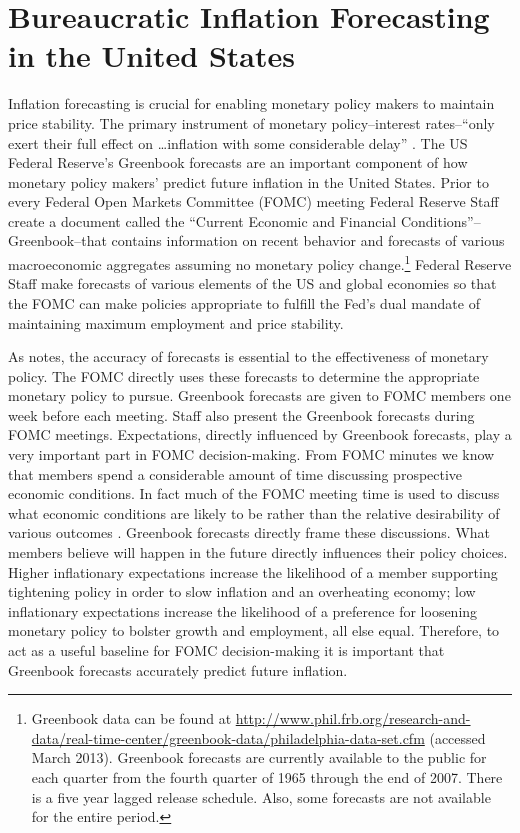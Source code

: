 \documentclass[a4paper]{article}
\begin{document}

\section{Bureaucratic Inflation Forecasting in the United States}

Inflation forecasting is crucial for enabling monetary policy makers to maintain price stability. The primary instrument of monetary policy--interest rates--``only exert their full effect on \ldots inflation with some considerable delay'' \cite[59]{Goodhart2001}. The US Federal Reserve's Greenbook forecasts are an important component of how monetary policy makers' predict future inflation in the United States. Prior to every Federal Open Markets Committee (FOMC) meeting Federal Reserve Staff create a document called the ``Current Economic and Financial Conditions''--Greenbook--that contains information on recent behavior and forecasts of various macroeconomic aggregates assuming no monetary policy change.\footnote{Greenbook data can be found at {\url{http://www.phil.frb.org/research-and-data/real-time-center/greenbook-data/philadelphia-data-set.cfm}} (accessed March 2013). Greenbook forecasts are currently available to the public for each quarter from the fourth quarter of 1965 through the end of 2007. There is a five year lagged release schedule. Also, some forecasts are not available for the entire period.} Federal Reserve Staff make forecasts of various elements of the US and global economies so that the FOMC can make policies appropriate to fulfill the Fed's dual mandate of maintaining maximum employment and price stability.

As \cite{Svensson2005} notes, the accuracy of forecasts is essential to the effectiveness of monetary policy. The FOMC directly uses these forecasts to determine the appropriate monetary policy to pursue. Greenbook forecasts are given to FOMC members one week before each meeting. Staff also present the Greenbook forecasts during FOMC meetings. Expectations, directly influenced by Greenbook forecasts, play a very important part in FOMC decision-making. From FOMC minutes we know that members spend a considerable amount of time discussing prospective economic conditions. In fact much of the FOMC meeting time is used to discuss what economic conditions are likely to be rather than the relative desirability of various outcomes \cite[230]{RomerRomer2008}. Greenbook forecasts directly frame these discussions. What members believe will happen in the future directly influences their policy choices. Higher inflationary expectations increase the likelihood of a member supporting tightening policy in order to slow inflation and an overheating economy; low inflationary expectations increase the likelihood of a preference for loosening monetary policy to bolster growth and employment, all else equal. Therefore, to act as a useful baseline for FOMC decision-making it is important that Greenbook forecasts accurately predict future inflation.
\end{document}
